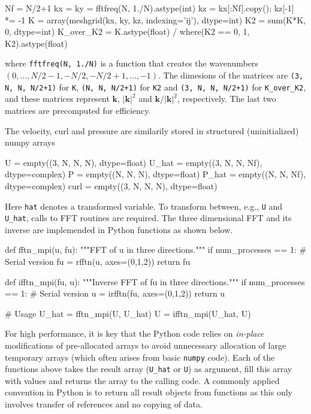 \documentclass[11pt, oneside]{article}
\newcommand{\inpyth}{\lstinline[style=pythonstyle, basicstyle=\ttfamily]} %[]%
\begin{document}
\begin{python}
Nf = N/2+1
kx = ky = fftfreq(N, 1./N).astype(int)
kz = kx[:Nf].copy(); kz[-1] *= -1
K = array(meshgrid(kx, ky, kz, indexing='ij'), dtype=int)
K2 = sum(K*K, 0, dtype=int)
K_over_K2 = K.astype(float) / where(K2 == 0, 1, K2).astype(float)
\end{python}
where \inpyth{fftfreq(N, 1./N)} is a function that creates the wavenumbers $(0, \ldots, N/2-1, -N/2, -N/2+1, \ldots, -1)$. The dimesions of the matrices are \inpyth{(3, N, N, N/2+1)} for \texttt{K}, \inpyth{(N, N, N/2+1)} for \texttt{K2} and \inpyth{(3, N, N, N/2+1)} for \texttt{K\_over\_K2}, and these matrices represent $\bm{k}$, $|\bm{k}|^2$ and $\bm{k}/|\bm{k}|^2$, respectively. The last two matrices are precomputed for efficiency.

The velocity, curl and pressure are similarily stored in structured (uninitialized) numpy arrays

\begin{python}
U     = empty((3, N, N, N),  dtype=float)
U_hat = empty((3, N, N, Nf), dtype=complex)
P     = empty((N, N, N),     dtype=float)
P_hat = empty((N, N, Nf),    dtype=complex)
curl  = empty((3, N, N, N),  dtype=float)
\end{python}
Here \inpyth{hat} denotes a transformed variable. To transform between, e.g., \inpyth{U} and \inpyth{U_hat}, calls to FFT routines are required. The three dimensional FFT and its inverse are implemended in Python functions as shown below.

\begin{python}
def fftn_mpi(u, fu):
    """FFT of u in three directions."""
    if num_processes == 1:                # Serial version
        fu = rfftn(u, axes=(0,1,2))
    return fu

def ifftn_mpi(fu, u):
    """Inverse FFT of fu in three directions."""
    if num_processes == 1:                # Serial version
        u = irfftn(fu, axes=(0,1,2))
    return u

# Usage
U_hat = fftn_mpi(U, U_hat)
U = ifftn_mpi(U_hat, U)
\end{python}
For high performance, it is key that the Python code relies on \emph{in-place}
modifications of pre-allocated arrays to avoid unnecessary allocation of
large temporary arrays (which often arises from basic \texttt{numpy} code).
Each of the functions above takes the result array (\texttt{U\_hat} or
\texttt{U}) as argument, fill this array with values and returns the
array to the calling code. A commonly applied convention in
Python is to return all result objects from functions as this only involves
transfer of references and no copying of data.
\end{document}
